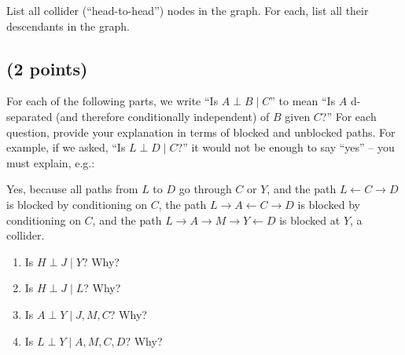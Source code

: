 \documentclass[12pt]{article}
\begin{document}
List all collider (``head-to-head'') nodes in the graph. For each, list all their descendants in the graph.

\subsection{(2 points)}

For each of the following parts, we write ``Is $A \perp B \mid C$'' to mean ``Is $A$ d-separated (and therefore conditionally independent) of $B$ given $C$?'' For each question, provide your explanation in terms of blocked and unblocked paths. For example, if we asked,
``Is $L \perp D \mid C$?'' it would not be enough to say ``yes'' -- you must explain, e.g.:

\begin{displayquote}
Yes, because all paths from $L$ to $D$ go through $C$ or $Y$, and the path $L \gets C \to D$ is blocked by conditioning on $C$, the path $L \to A \gets C \to D$ is blocked by conditioning on $C$, and the path $L \to A \to M \to Y \gets D$ is blocked at $Y$, a collider.
\end{displayquote}

\begin{enumerate}
\item Is $H \perp J \mid Y$? Why?
\item Is $H \perp J \mid L$? Why?
\item Is $A \perp Y \mid J, M, C$? Why?
\item Is $L \perp Y \mid A, M, C, D$? Why?
\end{enumerate}
\end{document}

